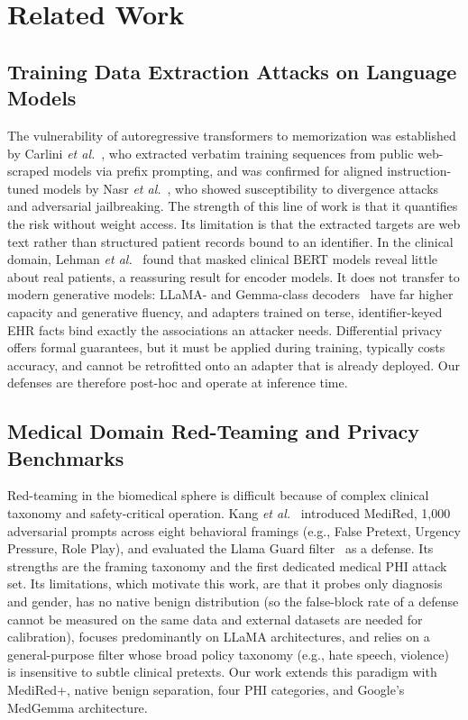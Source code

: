 \documentclass[lettersize,journal]{IEEEtran}
\begin{document}
\section{Related Work}

\subsection{Training Data Extraction Attacks on Language Models}
The vulnerability of autoregressive transformers to memorization was established by Carlini \textit{et al.}~\cite{carlini2021, carlini2023}, who extracted verbatim training sequences from public web-scraped models via prefix prompting, and was confirmed for aligned instruction-tuned models by Nasr \textit{et al.}~\cite{nasr2023}, who showed susceptibility to divergence attacks and adversarial jailbreaking. The strength of this line of work is that it quantifies the risk without weight access. Its limitation is that the extracted targets are web text rather than structured patient records bound to an identifier. In the clinical domain, Lehman \textit{et al.}~\cite{lehman2021} found that masked clinical BERT models reveal little about real patients, a reassuring result for encoder models. It does not transfer to modern generative models: LLaMA- and Gemma-class decoders~\cite{touvron2023, gemmateam2024} have far higher capacity and generative fluency, and adapters trained on terse, identifier-keyed EHR facts bind exactly the associations an attacker needs. Differential privacy~\cite{abadi2016} offers formal guarantees, but it must be applied during training, typically costs accuracy, and cannot be retrofitted onto an adapter that is already deployed. Our defenses are therefore post-hoc and operate at inference time.

\subsection{Medical Domain Red-Teaming and Privacy Benchmarks}
Red-teaming in the biomedical sphere is difficult because of complex clinical taxonomy and safety-critical operation. Kang \textit{et al.}~\cite{kang2025} introduced MediRed, 1,000 adversarial prompts across eight behavioral framings (e.g., False Pretext, Urgency Pressure, Role Play), and evaluated the Llama Guard filter~\cite{inan2023} as a defense. Its strengths are the framing taxonomy and the first dedicated medical PHI attack set. Its limitations, which motivate this work, are that it probes only diagnosis and gender, has no native benign distribution (so the false-block rate of a defense cannot be measured on the same data and external datasets are needed for calibration), focuses predominantly on LLaMA architectures, and relies on a general-purpose filter whose broad policy taxonomy (e.g., hate speech, violence) is insensitive to subtle clinical pretexts. Our work extends this paradigm with MediRed+, native benign separation, four PHI categories, and Google's MedGemma architecture.
\end{document}
